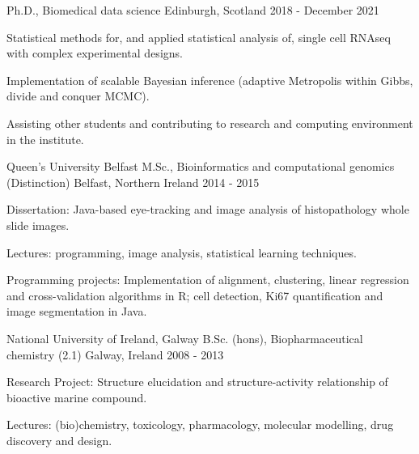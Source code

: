 


\begin{cventries}



 {
  Ph.D., Biomedical data science
} {
  Edinburgh, Scotland
} {
  2018 - December 2021
} {
  \begin{cvitems}
    \item
      Statistical methods for, and applied statistical analysis of, single cell
      RNAseq with complex experimental designs.
    \item
      Implementation of scalable Bayesian inference (adaptive Metropolis 
      within Gibbs, divide and conquer MCMC).
    \item
      Assisting other students and contributing to research and
      computing environment in the institute.
  \end{cvitems}
}

\cventry
{Queen's University Belfast} %
{M.Sc., Bioinformatics and computational genomics (Distinction)} %
{Belfast, Northern Ireland} %
{2014 - 2015} %
{ %
\begin{cvitems}
\item {Dissertation: Java-based eye-tracking and image analysis of histopathology whole slide images.}
\item {Lectures: programming, image analysis, statistical learning techniques.}
\item {Programming projects: Implementation of alignment, clustering, linear regression  and cross-validation algorithms in R; cell detection, Ki67 quantification and
image segmentation in Java.}
\end{cvitems}
}
\cventry
{National University of Ireland, Galway} %
{B.Sc. (hons), Biopharmaceutical chemistry (2.1)} %
{Galway, Ireland} %
{2008 - 2013} %
{ %
\begin{cvitems}
\item {Research Project: Structure elucidation and structure-activity relationship of bioactive marine compound.}
\item {Lectures: (bio)chemistry, toxicology, pharmacology, molecular modelling,
drug discovery and design.}
\end{cvitems}
}



\end{cventries}
